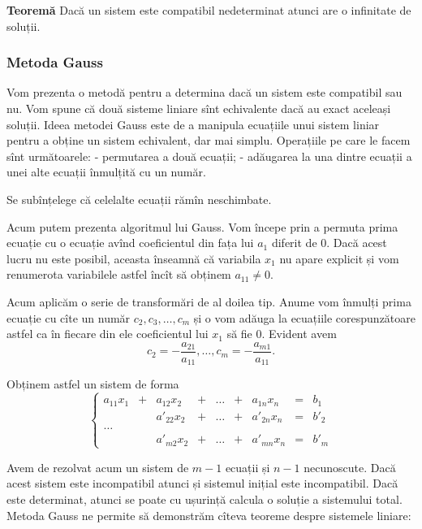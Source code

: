 \documentclass[11pt]{article}
\begin{document}
\textbf{Teoremă} Dacă un sistem este compatibil nedeterminat atunci are
o infinitate de soluții.

    \hypertarget{metoda-gauss}{%
\subsubsection{Metoda Gauss}\label{metoda-gauss}}

    Vom prezenta o metodă pentru a determina dacă un sistem este compatibil
sau nu. Vom spune că două sisteme liniare sînt echivalente dacă au exact
aceleași soluții. Ideea metodei Gauss este de a manipula ecuațiile unui
sistem liniar pentru a obține un sistem echivalent, dar mai simplu.
Operațiile pe care le facem sînt următoarele: - permutarea a două
ecuații; - adăugarea la una dintre ecuații a unei alte ecuații înmulțită
cu un număr.

Se subînțelege că celelalte ecuații rămîn neschimbate.

Acum putem prezenta algoritmul lui Gauss. Vom începe prin a permuta
prima ecuație cu o ecuație avînd coeficientul din fața lui \(a_1\)
diferit de \(0\). Dacă acest lucru nu este posibil, aceasta înseamnă că
variabila \(x_1\) nu apare explicit și vom renumerota variabilele astfel
încît să obținem \(a_{11} \neq 0\).

Acum aplicăm o serie de transformări de al doilea tip. Anume vom înmulți
prima ecuație cu cîte un număr \(c_2,c_3,\dots,c_m\) și o vom adăuga la
ecuațiile corespunzătoare astfel ca în fiecare din ele coeficientul lui
\(x_1\) să fie \(0\). Evident avem
\[c_2=-\frac{a_{21}}{a_{11}},\dots,c_m=-\frac{a_{m1}}{a_{11}}.\]

Obținem astfel un sistem de forma \[
 \left\{ \begin{matrix} a_{11}x_1 & + & a_{12}x_2 & + & \dots & + & a_{1n}x_n & = & b_1 \\
  & & a'_{22}x_2 & + & \dots & + & a'_{2n} x_n & = & b'_2 \\
  \ldots \\
  & & a'_{m2}x_2 & + & \dots & + & a'_{mn} x_n & = & b'_m
  \end{matrix}
  \right.
 \]

Avem de rezolvat acum un sistem de \(m-1\) ecuații și \(n-1\)
necunoscute. Dacă acest sistem este incompatibil atunci și sistemul
inițial este incompatibil. Dacă este determinat, atunci se poate cu
ușurință calcula o soluție a sistemului total. Metoda Gauss ne permite
să demonstrăm cîteva teoreme despre sistemele liniare:
\end{document}
